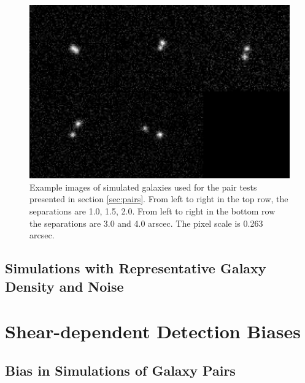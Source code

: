 \documentclass[fleqn,useAMS,usenatbib]{mnras}
\begin{document}
\begin{figure}
    \includegraphics[width=\textwidth]{figures/bdk-comb.png}

    \caption{ Example images of simulated galaxies used for the pair tests
    presented in section \ref{sec:pairs}.  From left to right in the top row,
    the separations are 1.0, 1.5, 2.0. From left to right in the bottom row the
    separations are 3.0 and 4.0 arscec. The pixel scale is 0.263 arcsec.
    \label{fig:pairs} }

\end{figure}


\subsection{Simulations with Representative Galaxy Density and Noise}

\section{Shear-dependent Detection Biases}

\subsection{Bias in Simulations of Galaxy Pairs}
\end{document}
